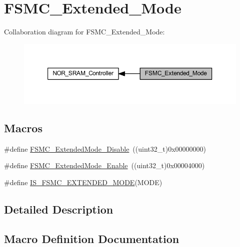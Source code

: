 \hypertarget{group___f_s_m_c___extended___mode}{}\section{F\+S\+M\+C\+\_\+\+Extended\+\_\+\+Mode}
\label{group___f_s_m_c___extended___mode}
Collaboration diagram for F\+S\+M\+C\+\_\+\+Extended\+\_\+\+Mode\+:
\nopagebreak
\begin{figure}[H]
\begin{center}
\leavevmode
\includegraphics[width=350pt]{group___f_s_m_c___extended___mode}
\end{center}
\end{figure}
\subsection*{Macros}
\begin{DoxyCompactItemize}
\item 
\#define \hyperlink{group___f_s_m_c___extended___mode_ga5a1f1acdc44328158f59012748980dd3}{F\+S\+M\+C\+\_\+\+Extended\+Mode\+\_\+\+Disable}~((uint32\+\_\+t)0x00000000)
\item 
\#define \hyperlink{group___f_s_m_c___extended___mode_gaef9ff4c81a52fdb0471d2c4422271d2a}{F\+S\+M\+C\+\_\+\+Extended\+Mode\+\_\+\+Enable}~((uint32\+\_\+t)0x00004000)
\item 
\#define \hyperlink{group___f_s_m_c___extended___mode_ga79849ea07bf2a8f09989a6babd9e66e2}{I\+S\+\_\+\+F\+S\+M\+C\+\_\+\+E\+X\+T\+E\+N\+D\+E\+D\+\_\+\+M\+O\+DE}(M\+O\+DE)
\end{DoxyCompactItemize}


\subsection{Detailed Description}


\subsection{Macro Definition Documentation}
\mbox{\label{group___f_s_m_c___extended___mode_ga5a1f1acdc44328158f59012748980dd3}} 

